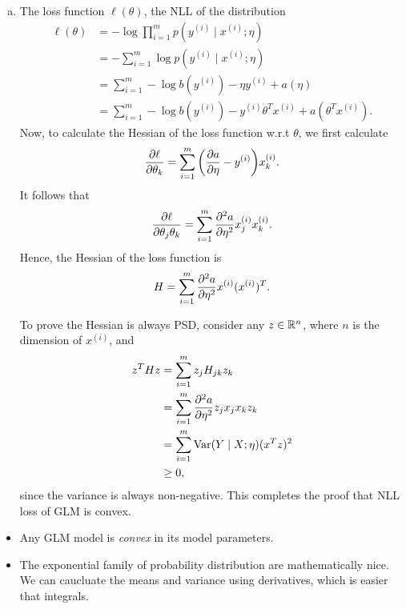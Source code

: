\documentclass[12pt,letterpaper,boxed]{hmcpset}
\newcommand{\yy}{y^{(i)}}
\newcommand{\xx}{x^{(i)}}
\begin{document}
\begin{solution}
\begin{enumerate}[(a)]
    \item The loss function $\ell(\theta)$, the NLL of the distribution
    \[
    \begin{aligned}
      \ell(\theta) &= - \log \prod_{i=1}^m p(\yy \mid \xx ; \eta) \\
      &= - \sum_{i=1}^{m} \log p(\yy \mid \xx ; \eta) \\
      &= \sum_{i=1}^{m} - \log b(\yy) - \eta \yy + a(\eta) \\
      &= \sum_{i=1}^{m} - \log b(\yy) - \yy \theta^T \xx + a(\theta^T \xx).
    \end{aligned}
    \]
    Now, to calculate the Hessian of the loss function w.r.t $\theta$, we first calculate
    \[
    \begin{aligned}
      \pdv{\ell}{\theta_k} = \sum_{i=1}^m \qty(\pdv{a}{\eta} - \yy) \xx_k.
    \end{aligned}
    \]
    It follows that
    \[
    \pdv{\ell}{\theta_j \theta_k} = \sum_{i=1}^m \pdv[2]{a}{\eta} \xx_j \xx_k.
    \]
    Hence, the Hessian of the loss function is 
    \[
    H = \sum_{i=1}^m \pdv[2]{a}{\eta} \xx (\xx)^T.
    \]

    To prove the Hessian is always PSD, consider any $z \in \mathbb{R}^n$, where $n$ is the dimension of $\xx$, and
    \[
    \begin{aligned}
      z^T H z &= \sum_{i=1}^m z_j H_{jk} z_k \\
      &= \sum_{i=1}^m \pdv[2]{a}{\eta} z_j x_j x_k z_k \\
      &= \sum_{i=1}^m \operatorname{Var}(Y \mid X; \eta) (x^T z)^2 \\
      &\geq 0,
    \end{aligned}
    \]
    since the variance is always non-negative. This completes the proof that NLL loss of GLM is convex.
  \end{enumerate}
\end{solution}

\begin{remark}
  \begin{itemize}
    \item Any GLM model is \emph{convex} in its model parameters.
    \item The exponential family of probability distribution are mathematically nice. We can caucluate the means and variance using derivatives, which is easier that integrals.
  \end{itemize}
\end{remark}
\end{document}
